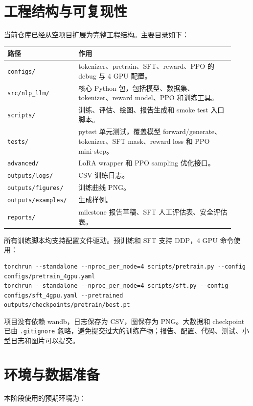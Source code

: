 \documentclass[UTF8,zihao=-4]{ctexart}
\begin{document}
\section{工程结构与可复现性}

当前仓库已经从空项目扩展为完整工程结构。主要目录如下：

\begin{longtable}{>{\raggedright\arraybackslash}p{0.28\linewidth}p{0.64\linewidth}}
\toprule
\textbf{路径} & \textbf{作用} \\
\midrule
\texttt{configs/} & tokenizer、pretrain、SFT、reward、PPO 的 debug 与 4 GPU 配置。\\
\texttt{src/nlp\_llm/} & 核心 Python 包，包括模型、数据集、tokenizer、reward model、PPO 和训练工具。\\
\texttt{scripts/} & 训练、评估、绘图、报告生成和 smoke test 入口脚本。\\
\texttt{tests/} & pytest 单元测试，覆盖模型 forward/generate、tokenizer、SFT mask、reward loss 和 PPO mini-step。\\
\texttt{advanced/} & LoRA wrapper 和 PPO sampling 优化接口。\\
\texttt{outputs/logs/} & CSV 训练日志。\\
\texttt{outputs/figures/} & 训练曲线 PNG。\\
\texttt{outputs/examples/} & 生成样例。\\
\texttt{reports/} & milestone 报告草稿、SFT 人工评估表、安全评估表。\\
\bottomrule
\end{longtable}

所有训练脚本均支持配置文件驱动。预训练和 SFT 支持 DDP，4 GPU 命令使用：

\begin{lstlisting}
torchrun --standalone --nproc_per_node=4 scripts/pretrain.py --config configs/pretrain_4gpu.yaml
torchrun --standalone --nproc_per_node=4 scripts/sft.py --config configs/sft_4gpu.yaml --pretrained outputs/checkpoints/pretrain/best.pt
\end{lstlisting}

项目没有依赖 wandb，日志保存为 CSV，图保存为 PNG。大数据和 checkpoint 已由 \texttt{.gitignore} 忽略，避免提交过大的训练产物；报告、配置、代码、测试、小型日志和图片可以提交。

\section{环境与数据准备}

本阶段使用的预期环境为：
\end{document}

